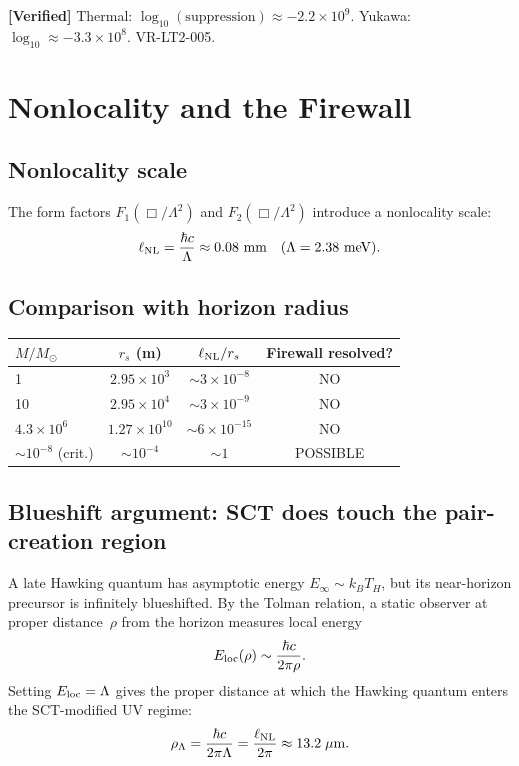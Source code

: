 \documentclass[11pt,a4paper]{article}
\theoremstyle{plain}
\theoremstyle{definition}
\newcommand{\verified}[1]{%
  \par\smallskip\noindent
  \colorbox{green!10}{\parbox{\dimexpr\linewidth-2\fboxsep}{%
    \textcolor{green!50!black}{\textbf{[Verified]}} #1}}%
  \par\smallskip}
\begin{document}
\verified{Thermal: $\log_{10}(\text{suppression}) \approx -2.2\times 10^{9}$.
  Yukawa: $\log_{10} \approx -3.3\times 10^{8}$.  VR-LT2-005.}


\section{Nonlocality and the Firewall}
\label{sec:firewall}

\subsection{Nonlocality scale}

The form factors $F_1(\Box/\Lambda^2)$ and $F_2(\Box/\Lambda^2)$ introduce
a nonlocality scale:
\begin{equation}
\ell_{\rm NL} = \frac{\hbar c}{\Lambda} \approx 0.08\text{ mm}
\quad (\Lambda = 2.38\text{ meV}).
\end{equation}

\subsection{Comparison with horizon radius}

\begin{center}
\begin{tabular}{lccc}
\toprule
$M/M_\odot$ & $r_s$ (m) & $\ell_{\rm NL}/r_s$ & Firewall resolved? \\
\midrule
1            & $2.95\times10^3$   & $\sim 3\times10^{-8}$ & NO \\
10           & $2.95\times10^4$   & $\sim 3\times10^{-9}$ & NO \\
$4.3\times10^6$ & $1.27\times10^{10}$ & $\sim 6\times10^{-15}$ & NO \\
$\sim 10^{-8}$ (crit.) & $\sim 10^{-4}$ & $\sim 1$ & POSSIBLE \\
\bottomrule
\end{tabular}
\end{center}

\subsection{Blueshift argument: SCT does touch the pair-creation region}

A late Hawking quantum has asymptotic energy $E_\infty \sim k_B T_H$,
but its near-horizon precursor is infinitely blueshifted.  By the
Tolman relation, a static observer at proper distance~$\rho$ from the
horizon measures local energy
\begin{equation}
\label{eq:e-loc}
E_{\rm loc}(\rho) \sim \frac{\hbar c}{2\pi\rho}.
\end{equation}
Setting $E_{\rm loc} = \Lambda$ gives the proper distance at which the
Hawking quantum enters the SCT-modified UV regime:
\begin{equation}
\label{eq:rho-lambda}
\rho_\Lambda = \frac{\hbar c}{2\pi\Lambda}
             = \frac{\ell_{\rm NL}}{2\pi}
             \approx 13.2\;\mu\text{m}.
\end{equation}
\end{document}
